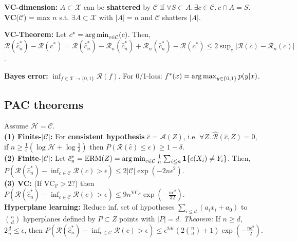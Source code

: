 \textbf{VC-dimension:} $A\subset\mathcal{X}$ can be \textbf{shattered} by $\mathcal{C}$ if $\forall S\subset A.\, \exists c\in\mathcal{C}.\, c\cap A = S$.
\textbf{VC}($\mathcal{C}$) = max $n$ s.t. $\exists A\subset\mathcal{X}$ with $|A|=n$ and $\mathcal{C}$ shatters $|A|$. 

\textbf{VC-Theorem:} Let $c^* = \operatorname*{arg\,min}_{c\in\mathcal{C}}(c)$. Then, $\mathcal{R}(\hat{c}^*_n) - \mathcal{R}(c^*)  = \mathcal{R}(\hat{c}^*_n) - \mathcal{R}_n(\hat{c}^*_n) + \mathcal{R}_n(\hat{c}^*_n) - \mathcal{R}(c^*) \leq 2\sup_c|\mathcal{R}(c)-\mathcal{R}_n(c)|$.

\textbf{Bayes error:} $\inf_{f\in\mathcal{X}\to\{0,1\}}\mathcal{R}(f)$. For 0/1-loss: $f^*(x) = \operatorname*{arg\,max}_{y\in\{0,1\}}p(y|x)$.

\subsection*{PAC theorems}
Assume $\mathcal{H} = \mathcal{C}$.\\
\textbf{(1) Finite-$|\mathcal{C}|$:} For \textbf{consistent hypothesis} $\hat{c}=\mathcal{A}(Z)$, i.e. $\forall Z.\,\mathcal{\hat{R}}(\hat{c},Z)=0$, if $n\geq \frac{1}{\epsilon}(\log\mathcal{H}+\log\frac{1}{\delta})$ then $P(\mathcal{R}(\hat{c}) \leq \epsilon) \geq 1-\delta$.\\
\textbf{(2) Finite-$|\mathcal{C}|$:} Let $\hat{c}^*_n = \mathrm{ERM}(Z) = \operatorname*{arg\,min}_{c\in\mathcal{C}}\frac{1}{n}\sum_{i\leq n}\mathbf{1}\{c(X_i)\neq Y_i\}$. Then, $P(\mathcal{R}(\hat{c}^*_n) - \inf_{c\in\mathcal{C}}\mathcal{R}(c) > \epsilon) \leq 2|\mathcal{C}|\exp(-2n\epsilon^2)$.\\
\textbf{(3) VC:} (If $\mathrm{VC}_\mathcal{C}>2$?) then 
$P(\mathcal{R}(\hat{c}^*_n) - \inf_{c\in\mathcal{C}}\mathcal{R}(c) > \epsilon) \leq 9n^{\mathrm{VC}_\mathcal{C}}\exp(-\frac{n\epsilon^2}{32})$.\\
\textbf{Hyperplane learning:} Reduce inf. set of hypotheses $\sum_{i\leq d}(a_i x_i + a_0)$ to $\binom{n}{d}$ hyperplanes defined by $P\subset Z$ points with $|P| = d$. \emph{Theorem:} If $n\geq d$, $2\frac{d}{n}\leq\epsilon$, then $P(\mathcal{R}(\hat{c}^*_n)-\inf_{c\in\mathcal{C}}\mathcal{R}(c)>\epsilon) \leq \epsilon^{2d\epsilon}(2\binom{n}{d}+1)\exp(-\frac{n\epsilon^2}{2})$.

